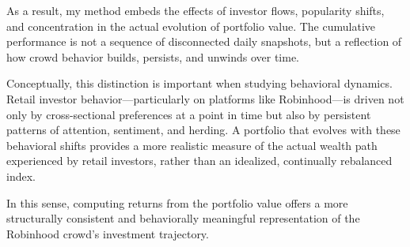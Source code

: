 As a result, my method embeds the effects of investor flows, popularity shifts, and concentration in the actual evolution of portfolio value.
The cumulative performance is not a sequence of disconnected daily snapshots, but a reflection of how crowd behavior builds, persists, and unwinds over time.

Conceptually, this distinction is important when studying behavioral dynamics.
Retail investor behavior—particularly on platforms like Robinhood—is driven not only by cross-sectional preferences at a point in time but also by persistent patterns of attention, sentiment, and herding.
A portfolio that evolves with these behavioral shifts provides a more realistic measure of the actual wealth path experienced by retail investors, rather than an idealized, continually rebalanced index.

In this sense, computing returns from the portfolio value offers a more structurally consistent and behaviorally meaningful representation of the Robinhood crowd's investment trajectory.
